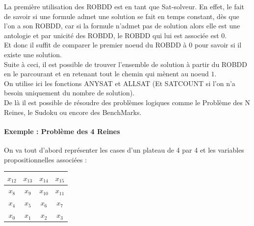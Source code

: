 \documentclass[a4paper, oneside]{report}
\begin{document}
La première utilisation des ROBDD est en tant que Sat-solveur. En effet, le fait de savoir si une formule admet une solution se fait en temps constant, dès que l'on a son ROBDD, car si la formule n'admet pas de solution alors elle est une antologie et par unicité des ROBDD, le ROBDD qui lui est associée est $0$.\\
Et donc il suffit de comparer le premier noeud du ROBDD à $0$ pour savoir si il existe une solution.\\

Suite à ceci, il est possible de trouver l'ensemble de solution à partir du ROBDD en le parcourant et en retenant tout le chemin qui mènent au noeud $1$.\\

On utilise ici les fonctions ANYSAT et ALLSAT (Et SATCOUNT si l'on n'a besoin uniquement du nombre de solution).\\

De là il est possible de résoudre des problèmes logiques comme le Problème des N Reines, le Sudoku ou encore des BenchMarks.\\

\paragraph{Exemple : Problème des 4 Reines\\}

On va tout d'abord représenter les cases d'un plateau de 4 par 4 et les variables propositionnelles associées :
\begin{center}
\setlength{\tabcolsep}{12pt}
\renewcommand{\arraystretch}{3}
\begin{tabular}{|c|c|c|c|}
\hline 
 \cellcolor{green}$x_{12}$ & $x_{13}$ 			  & \cellcolor{gray}$x_{14}$ & $x_{15}$ 				\\ 
\hline
 $x_8$ 					  & \cellcolor{gray}$x_9$ & $x_{10}$				 & \cellcolor{gray}$x_{11}$ \\ 
\hline
 \cellcolor{gray}$x_4$ 	  &  $x_5$				  & \cellcolor{gray}$x_6$	 & $x_7$ 					\\ 
\hline
$x_0$ 					  & \cellcolor{gray}$x_1$ & $x_2$ 					 & \cellcolor{gray}$x_3$ 	\\ 
\hline 
\end{tabular}
\renewcommand{\arraystretch}{1}
\setlength{\tabcolsep}{6pt}
\end{center}
\end{document}
